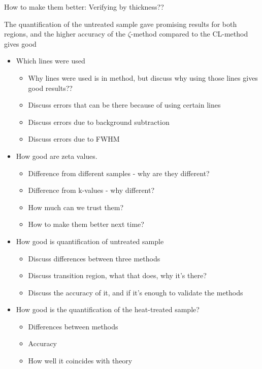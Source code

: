 How to make them better:
Verifying by thickness??

The quantification of the untreated sample gave promising results for both regions, and the higher accuracy of the $\zeta$-method compared to the CL-method gives good 


\begin{itemize}
	\item Which lines were used
	\begin{itemize}
		\item Why lines were used is in method, but discuss why using those lines gives good results??
		\item Discuss errors that can be there because of using certain lines
		\item Discuss errors due to background subtraction
		\item Discuss errors due to FWHM
	\end{itemize}
	\item How good are zeta values.
	\begin{itemize}
		\item Difference from different samples - why are they different?
		\item Difference from k-values - why different?
		\item How much can we trust them?
		\item How to make them better next time?
	\end{itemize}
	\item How good is quantification of untreated sample
	\begin{itemize}
		\item Discuss differences between three methods
		\item Discuss transition region, what that does, why it's there?
		\item Discuss the accuracy of it, and if it's enough to validate the methods
		
	\end{itemize}
	\item How good is the quantification of the heat-treated sample?
	\begin{itemize}
		\item Differences between methods
		\item Accuracy
		\item How well it coincides with theory
	\end{itemize}
\end{itemize}
